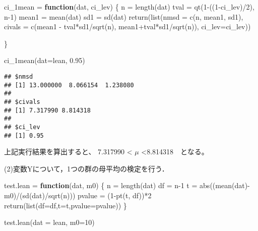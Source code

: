\documentclass[
]{article}
\newenvironment{Shaded}{\begin{snugshade}}{\end{snugshade}}
\newcommand{\AttributeTok}[1]{\textcolor[rgb]{0.77,0.63,0.00}{#1}}
\newcommand{\ControlFlowTok}[1]{\textcolor[rgb]{0.13,0.29,0.53}{\textbf{#1}}}
\newcommand{\DecValTok}[1]{\textcolor[rgb]{0.00,0.00,0.81}{#1}}
\newcommand{\FloatTok}[1]{\textcolor[rgb]{0.00,0.00,0.81}{#1}}
\newcommand{\FunctionTok}[1]{\textcolor[rgb]{0.00,0.00,0.00}{#1}}
\newcommand{\NormalTok}[1]{#1}
\newcommand{\OtherTok}[1]{\textcolor[rgb]{0.56,0.35,0.01}{#1}}
\newcommand{\SpecialCharTok}[1]{\textcolor[rgb]{0.00,0.00,0.00}{#1}}
\begin{document}
\begin{Shaded}
\begin{Highlighting}[]
\NormalTok{ci\_1mean }\OtherTok{=} \ControlFlowTok{function}\NormalTok{(dat, ci\_lev)}
\NormalTok{\{}
\NormalTok{  n }\OtherTok{=} \FunctionTok{length}\NormalTok{(dat)}
\NormalTok{  tval }\OtherTok{=} \FunctionTok{qt}\NormalTok{(}\DecValTok{1}\SpecialCharTok{{-}}\NormalTok{((}\DecValTok{1}\SpecialCharTok{{-}}\NormalTok{ci\_lev)}\SpecialCharTok{/}\DecValTok{2}\NormalTok{), n}\DecValTok{{-}1}\NormalTok{)}
\NormalTok{  mean1 }\OtherTok{=} \FunctionTok{mean}\NormalTok{(dat)}
\NormalTok{  sd1 }\OtherTok{=} \FunctionTok{sd}\NormalTok{(dat)}
  \FunctionTok{return}\NormalTok{(}\FunctionTok{list}\NormalTok{(}\AttributeTok{nmsd =} \FunctionTok{c}\NormalTok{(n, mean1, sd1),}
              \AttributeTok{civals =} \FunctionTok{c}\NormalTok{(mean1 }\SpecialCharTok{{-}}\NormalTok{ tval}\SpecialCharTok{*}\NormalTok{sd1}\SpecialCharTok{/}\FunctionTok{sqrt}\NormalTok{(n),}
\NormalTok{              mean1}\SpecialCharTok{+}\NormalTok{tval}\SpecialCharTok{*}\NormalTok{sd1}\SpecialCharTok{/}\FunctionTok{sqrt}\NormalTok{(n)),}
              \AttributeTok{ci\_lev=}\NormalTok{ci\_lev))}
  
\NormalTok{\}}

\FunctionTok{ci\_1mean}\NormalTok{(}\AttributeTok{dat=}\NormalTok{lean, }\FloatTok{0.95}\NormalTok{)}
\end{Highlighting}
\end{Shaded}

\begin{verbatim}
## $nmsd
## [1] 13.000000  8.066154  1.238080
## 
## $civals
## [1] 7.317990 8.814318
## 
## $ci_lev
## [1] 0.95
\end{verbatim}

上記実行結果を算出すると、 7.317990 \textless{} \(\mu\)
\textless8.814318　となる。

(2)変数Yについて，1つの群の母平均の検定を行う．

\begin{Shaded}
\begin{Highlighting}[]
\NormalTok{test.lean }\OtherTok{=} \ControlFlowTok{function}\NormalTok{(dat, m0)}
\NormalTok{\{}
\NormalTok{  n }\OtherTok{=} \FunctionTok{length}\NormalTok{(dat)}
\NormalTok{  df }\OtherTok{=}\NormalTok{ n}\DecValTok{{-}1}
\NormalTok{  t }\OtherTok{=} \FunctionTok{abs}\NormalTok{((}\FunctionTok{mean}\NormalTok{(dat)}\SpecialCharTok{{-}}\NormalTok{m0)}\SpecialCharTok{/}\NormalTok{(}\FunctionTok{sd}\NormalTok{(dat)}\SpecialCharTok{/}\FunctionTok{sqrt}\NormalTok{(n)))}
\NormalTok{  pvalue }\OtherTok{=}\NormalTok{ (}\DecValTok{1}\SpecialCharTok{{-}}\FunctionTok{pt}\NormalTok{(t, df))}\SpecialCharTok{*}\DecValTok{2}
  \FunctionTok{return}\NormalTok{(}\FunctionTok{list}\NormalTok{(}\AttributeTok{df=}\NormalTok{df,}\AttributeTok{t=}\NormalTok{t,}\AttributeTok{pvalue=}\NormalTok{pvalue))}
\NormalTok{\}}

\FunctionTok{test.lean}\NormalTok{(}\AttributeTok{dat =}\NormalTok{ lean, }\AttributeTok{m0=}\DecValTok{10}\NormalTok{)}
\end{Highlighting}
\end{Shaded}
\end{document}
